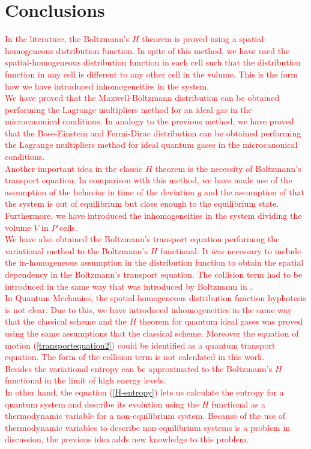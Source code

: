 \documentclass{article}
\begin{document}
\section{Conclusions}
\textcolor{red}{
In the literature, the Boltzmann's $H$ theorem is proved using a spatial-homogeneous distribution function. In spite of this method, we have used the spatial-homogeneous distribution function in each cell such that the distribution function in any cell is different to any other cell in the volume. This is the form how we have introduced inhomogeneities in the system.\\
We have proved that the Maxwell-Boltzmann distribution can be obtained performing the Lagrange multipliers method for an ideal gas in the microcanonical conditions. In analogy to the previous method, we have proved that the Bose-Einstein and Fermi-Dirac distribution can be obtained performing the Lagrange multipliers method for ideal quantum gases in the microcanonical conditions.\\  
Another important idea in the classic $H$ theorem is the necessity of Boltzmann's transport equation. In comparison with this method, we have made use of the assumption of the behavior in time of the deviation $g$ and the assumption of that the system is out of equilibrium but close enough to the equilibrium state. Furthermore, we have introduced the inhomogeneities in the system dividing the volume $V$ in $P$ cells.\\
We have also obtained the Boltzmann's transport equation performing the variational method to the Boltzmann's $H$ functional. It was necessary to include the in-homogeneous assumption in the distribution function to obtain the spatial dependency in the Boltzmann's transport equation. The collision term had to be introduced in the same way that was introduced by Boltzmann in \cite{huang}.\\
In Quantum Mechanics, the spatial-homogeneous distribution function hyphotesis is not clear. Due to this, we have introduced inhomogeneities in the same way that the classical scheme and the $H$ theorem for quantum ideal gases was proved using the same assumptions that the classical scheme. Moreover the equation of motion (\ref{transportequation2}) could be identified as a quantum transport equation. The form of the collision term is not calculated in this work. \\
Besides the variational entropy can be approximated to the Boltzmann's $H$ functional in the limit of high energy levels.\\
In other hand, the equation (\ref{H-entropy}) lets us calculate the entropy for a quantum system and describe its evolution using the $H$ functional as a thermodynamic variable for a non-equilibrium system. Because of the use of thermodynamic variables to describe non-equilibrium systems is a problem in discussion, the previous idea adds new knowledge to this problem. }
\clearpage
\end{document}
